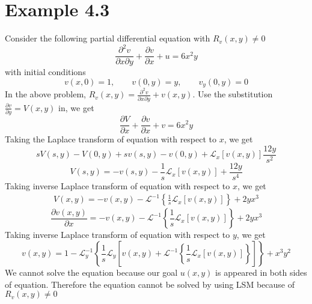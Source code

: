 \documentclass[11pt]{report}
\newcommand{\Laplace}{\mathcal{L}}
\newcommand{\InverseLx}[1]{\Laplace^{-1}\left\{ #1 \right\}}
\newcommand{\dsp}{\displaystyle}
\begin{document}
	\section*{Example 4.3}
	Consider the following partial differential equation with $R_v(x,y) \neq 0$
	\begin{equation*}
		\frac{\partial^2 v}{\partial x \partial y} + \frac{\partial v}{\partial x} + u = 6x^2 y\label{eq:p_3_1}
	\end{equation*}
	with initial conditions
	\begin{equation*}
		v(x,0)=1,\qquad v(0,y)=y,\qquad v_y(0,y)=0\label{eq:p_3_2}
	\end{equation*}
	In the above problem, $\dsp R_v(x,y) = \frac{\partial^2 v}{\partial x \partial y} + v(x,y)$. Use the substitution $\dsp \frac{\partial v}{\partial y}= V(x,y)$ in, we get
	\begin{equation*}
		\frac{\partial V}{\partial x} + \frac{\partial v}{\partial x} + v = 6x^2 y\label{eq:p_3_3}
	\end{equation*}
	Taking the Laplace transform of equation with respect to $x$, we get
	\begin{equation*}
		sV(s,y) - V(0,y) + sv(s,y) - v(0,y) + \Laplace_x\left[v(x,y)\right]\frac{12y}{s^2} 
	\end{equation*}
	\begin{equation*}
		V(s,y) = -v(s,y) - \frac{1}{s}\Laplace_x\left[v(x,y)\right]+ \frac{12y}{s^4}\label{eq:p_3_4}
	\end{equation*}
	Taking inverse Laplace transform of equation with respect to $x$, we get 
	\begin{eqnarray*}
		V(x,y) = -v(x,y) - \InverseLx{\frac{1}{s}\Laplace_x\left[v(x,y)\right]} + 2yx^3
	\end{eqnarray*}
	\begin{equation*}
		\frac{\partial v(x,y)}{\partial x} = - v(x,y) - \InverseLx{\frac{1}{s}\Laplace_x\left[v(x,y)\right]}+2yx^3\label{eq:p_3_5}
	\end{equation*}
	Taking inverse Laplace transform of equation  with respect to $y$, we get
	\begin{equation*}
		v(x,y) = 1-\Laplace_y^{-1}\left\{\frac{1}{s}\Laplace_y\left[v(x,y) + \InverseLx{\frac{1}{s}\Laplace_x\left[v(x,y)\right]}\right]\right\} + x^3 y^2\label{eq:p_3_6}
	\end{equation*}
	We cannot solve the equation because our goal $u(x,y)$ is appeared in both sides of equation. Therefore the equation cannot be solved by using LSM because of $R_v(x,y) \neq 0$
\end{document}
